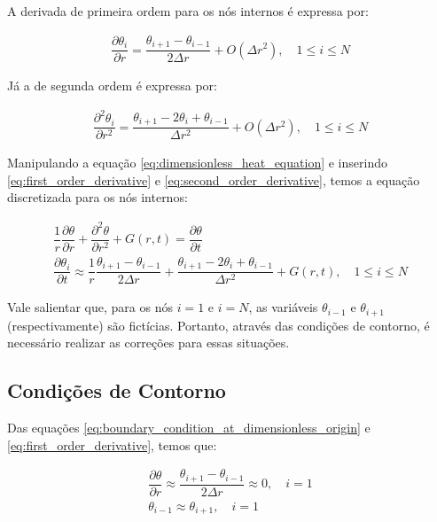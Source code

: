 A derivada de primeira ordem para os nós internos é expressa por: 

\begin{gather}
    \dfrac{\partial \theta _i}{\partial r} = \dfrac{\theta _{i+1} - \theta _{i-1}}{2 \Delta r} + O(\Delta r^2), \quad 1 \leq i \leq N
    \label{eq:first_order_derivative}
\end{gather}

Já a de segunda ordem é expressa por: 

\begin{gather}
\dfrac{\partial ^2 \theta _i}{\partial r ^2} = \dfrac{\theta _{i+1} - 2 \theta _i + \theta _{i-1}}{\Delta r^2} + O(\Delta r^2), \quad 1 \leq i \leq N
\label{eq:second_order_derivative}
\end{gather}

Manipulando a equação \ref{eq:dimensionless_heat_equation} e inserindo \ref{eq:first_order_derivative} e \ref{eq:second_order_derivative}, temos a equação discretizada para os nós internos: 

\begin{gather}
\dfrac{1}{r} \dfrac{\partial \theta}{\partial r} + \dfrac{\partial ^2 \theta}{\partial r ^2} + G(r, t) = \dfrac{\partial \theta}{\partial t} \\   
\dfrac{\partial \theta _i}{\partial t} \approx \dfrac{1}{r} \dfrac{\theta _{i+1} - \theta _{i-1}}{2 \Delta r} + \dfrac{\theta _{i+1} - 2 \theta _i + \theta _{i-1}}{\Delta r^2} + G(r, t), \quad 1 \leq i \leq N
\label{eq:discretized_heat_equation}
\end{gather}

Vale salientar que, para os nós \(i = 1\) e \(i = N\), as variáveis \(\theta _{i-1}\) e \(\theta _{i+1}\) (respectivamente) são fictícias. Portanto, através das condições de contorno, é necessário realizar as correções para essas situações. 

\subsection{Condições de Contorno} 

Das equações \ref{eq:boundary_condition_at_dimensionless_origin} e \ref{eq:first_order_derivative}, temos que: 

\begin{gather} 
\dfrac{\partial \theta}{\partial r} \approx \dfrac{\theta _{i+1} - \theta _{i-1}}{2 \Delta r} \approx 0, \quad i = 1 \\ 
\theta _{i-1} \approx \theta _{i+1}, \quad i = 1 
\label{eq:correction_at_the_origin} 
\end{gather} 

